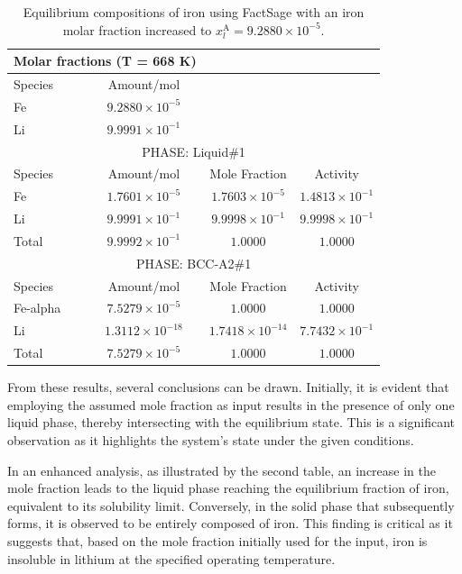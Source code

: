 \begin{table}[ht]
	\centering
	\label{tab:stream_phases}
	\begin{tabular}{lccc}
	\hline
	\multicolumn{2}{c}{Molar fractions (T = 668 K)} \\
	\hline
	Species & Amount/mol  \\
	\hline
	Fe & $9.2880 \times 10^{-5}$  \\
	Li & $9.9991 \times 10^{-1}$  \\
	\hline
	\multicolumn{4}{c}{PHASE: Liquid\#1} \\
	\hline
	Species & Amount/mol & Mole Fraction & Activity \\
	\hline
	Fe & $1.7601 \times 10^{-5}$ & $1.7603 \times 10^{-5}$ & $1.4813 \times 10^{-1}$ \\
	Li & $9.9991 \times 10^{-1}$ & $9.9998 \times 10^{-1}$ & $9.9998 \times 10^{-1}$ \\
	Total & $9.9992 \times 10^{-1}$ & $1.0000$ & $1.0000$ \\
	\hline
	\multicolumn{4}{c}{PHASE: BCC-A2\#1} \\
	\hline
	Species & Amount/mol & Mole Fraction & Activity \\
	\hline
	Fe-alpha & $7.5279 \times 10^{-5}$ & $1.0000$ & $1.0000$ \\
	Li & $1.3112 \times 10^{-18}$ & $1.7418 \times 10^{-14}$ & $7.7432 \times 10^{-1}$ \\
	Total & $7.5279 \times 10^{-5}$ & $1.0000$ & $1.0000$ \\
	\hline
	\end{tabular}
	\caption{Equilibrium compositions of iron using FactSage with an iron molar fraction increased to $x^{\text{A}}_{l} = 9.2880 \times 10^{-5}$.}
\end{table}
		
From these results, several conclusions can be drawn. Initially, it is evident that employing the 
assumed mole fraction as input results in the presence of only one liquid phase, thereby intersecting 
with the equilibrium state. This is a significant observation as it highlights the system's state under the given conditions.

In an enhanced analysis, as illustrated by the second table, an increase in the mole fraction leads to the liquid 
phase reaching the equilibrium fraction of iron, equivalent to its solubility limit. Conversely, in the solid phase 
that subsequently forms, it is observed to be entirely composed of iron. This finding is critical as it suggests that, 
based on the mole fraction initially used for the input, iron is insoluble in lithium at the specified operating temperature.

